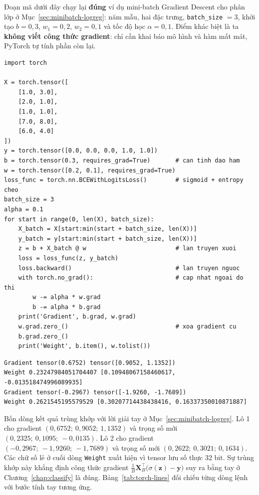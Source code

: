 Đoạn mã dưới đây chạy lại \textbf{đúng} ví dụ mini-batch Gradient Descent cho phân lớp ở Mục~\ref{sec:minibatch-logreg}: năm mẫu, hai đặc trưng, \texttt{batch\_size} $= 3$, khởi tạo $b = 0{,}3$, $w_1 = 0{,}2$, $w_2 = 0{,}1$ và tốc độ học $\alpha = 0{,}1$. Điểm khác biệt là ta \textbf{không viết công thức gradient}: chỉ cần khai báo mô hình và hàm mất mát, PyTorch tự tính phần còn lại.

\begin{lstlisting}[caption={Mini-batch Gradient Descent cho hồi quy logistic với autograd của PyTorch}]
import torch

X = torch.tensor([
    [1.0, 3.0],
    [2.0, 1.0],
    [1.0, 1.0],
    [7.0, 8.0],
    [6.0, 4.0]
])
y = torch.tensor([0.0, 0.0, 0.0, 1.0, 1.0])
b = torch.tensor(0.3, requires_grad=True)       # can tinh dao ham
w = torch.tensor([0.2, 0.1], requires_grad=True)
loss_func = torch.nn.BCEWithLogitsLoss()        # sigmoid + entropy cheo
batch_size = 3
alpha = 0.1
for start in range(0, len(X), batch_size):
    X_batch = X[start:min(start + batch_size, len(X))]
    y_batch = y[start:min(start + batch_size, len(X))]
    z = b + X_batch @ w                         # lan truyen xuoi
    loss = loss_func(z, y_batch)
    loss.backward()                             # lan truyen nguoc
    with torch.no_grad():                       # cap nhat ngoai do thi
        w -= alpha * w.grad
        b -= alpha * b.grad
    print('Gradient', b.grad, w.grad)
    w.grad.zero_()                              # xoa gradient cu
    b.grad.zero_()
    print('Weight', b.item(), w.tolist())
\end{lstlisting}

\begin{lstlisting}[caption={Kết quả chạy đoạn mã trên}, numbers=none]
Gradient tensor(0.6752) tensor([0.9052, 1.1352])
Weight 0.23247984051704407 [0.10948067158460617, -0.013518474996089935]
Gradient tensor(-0.2967) tensor([-1.9260, -1.7689])
Weight 0.2621545195579529 [0.30207714438438416, 0.16337350010871887]
\end{lstlisting}

Bốn dòng kết quả trùng khớp với lời giải tay ở Mục~\ref{sec:minibatch-logreg}. Lô 1 cho gradient $(0{,}6752;\ 0{,}9052;\ 1{,}1352)$ và trọng số mới $(0{,}2325;\ 0{,}1095;\ -0{,}0135)$. Lô 2 cho gradient $(-0{,}2967;\ -1{,}9260;\ -1{,}7689)$ và trọng số mới $(0{,}2622;\ 0{,}3021;\ 0{,}1634)$. Các chữ số lẻ ở cuối dòng \texttt{Weight} xuất hiện vì tensor lưu số thực 32 bit. Sự trùng khớp này khẳng định công thức gradient $\frac{1}{B}\mathbf{X}_B^\top\big(\sigma(\mathbf{z}) - \mathbf{y}\big)$ suy ra bằng tay ở Chương~\ref{chap:classify} là đúng. Bảng~\ref{tab:torch-lines} đối chiếu từng dòng lệnh với bước tính tay tương ứng.


